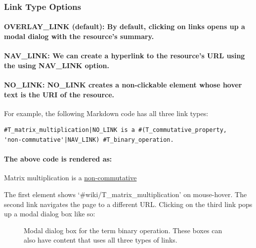 \documentclass[a4paper]{article}
\begin{document}
\subsubsection{Link Type Options}

\paragraph{\textbf{OVERLAY\_LINK} (default): By default, clicking on links opens up a modal dialog with the resource's summary.}

\paragraph{\textbf{NAV\_LINK}: We can create a hyperlink to the resource's URL using the using NAV\_LINK option.}

\paragraph{\textbf{NO\_LINK}: NO\_LINK creates a non-clickable element whose hover text is the URI of the resource.}


For example, the following Markdown code has all three link types:
\begin{verbatim}
#T_matrix_multiplication|NO_LINK is a #(T_commutative_property, 
'non-commutative'|NAV_LINK) #T_binary_operation.
\end{verbatim}

\paragraph{The above code is rendered as:}
\begin{mdframed}
Matrix multiplication is a \underline{non-commutative} 
\end{mdframed}
The first element shows `\#wiki/T\_matrix\_multiplication' on mouse-hover. The second link navigates the page to a different URL. Clicking on the third link pops up a modal dialog box like so:

\begin{figure}[ht]
\begin{center}
\caption{Modal dialog box for the term binary operation. These boxes can also have content that uses all three types of links. }
\label{modal}
\end{center}
\end{figure}
\end{document}

